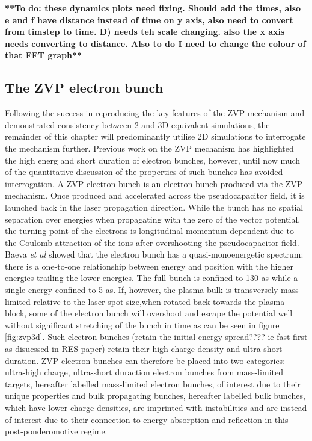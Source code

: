 \textbf{**To do: these dynamics plots need fixing. Should add the times, also e and f have distance instead of time on y axis, also need to convert from timstep to time. D) needs teh scale changing. also the x axis needs converting to distance. Also to do I need to change the colour of that FFT graph**}


\subsection{The ZVP electron bunch}
Following the success in reproducing the key features of the \ac{ZVP} mechanism and demonstrated consistency between 2 and 3D equivalent simulations, the remainder of this chapter will predominantly utilise 2D simulations to interrogate the mechanism further. Previous work on the ZVP mechanism has highlighted the high energ and short duration of electron bunches, however, until now much of the quantitative discussion of the properties of such bunches has avoided interrogation. A ZVP electron bunch is an electron bunch produced via the ZVP mechanism. Once produced and accelerated across the pseudocapacitor field, it is launched back in the laser propagation direction. While the bunch has no spatial separation over energies when propagating with the zero of the vector potential, the turning point of the electrons is longitudinal momentum dependent due to the Coulomb attraction of the ions after overshooting the pseudocapacitor field. Baeva \textit{et al} showed that the electron bunch has a quasi-monoenergetic spectrum: there is a one-to-one relationship between energy and position with the higher energies trailing the lower energies. The full bunch is confined to 130 as while a single energy confined to 5 as. If, however, the plasma bulk is transversely mass-limited relative to the laser spot size,when rotated back towards the plasma block, some of the electron bunch will overshoot and escape the potential well without significant stretching of the bunch in time as can be seen in figure \ref{fig:zvp3d}. Such electron bunches (retain the initial energy spread???? ie fast first as disucssed in RES paper) retain their high charge density and ultra-short duration. ZVP electron bunches can therefore be placed into two categories: ultra-high charge, ultra-short duraction electron bunches from mass-limited targets, hereafter labelled mass-limited electron bunches, of interest due to their unique properties and bulk propagating bunches, hereafter labelled bulk bunches, which have lower charge densities, are imprinted with instabilities and are instead of interest due to their connection to energy absorption and reflection in this post-ponderomotive regime.
 
